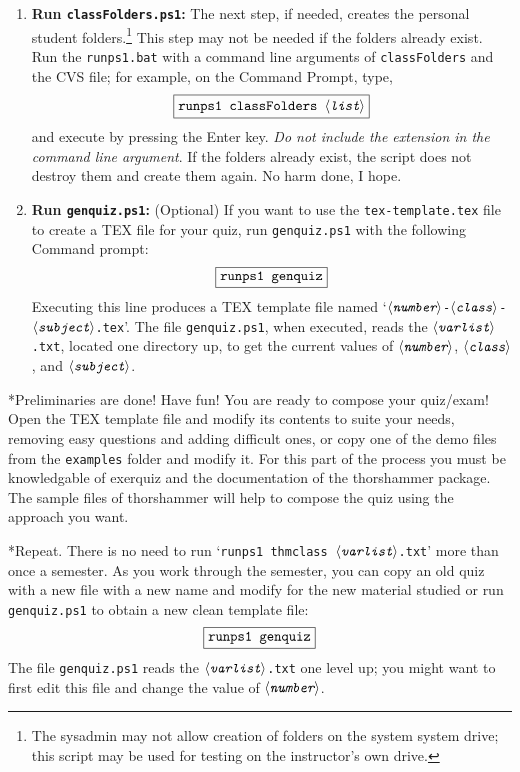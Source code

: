 \documentclass{article}
\makeatletter
\let\pkg\textsf
\let\app\textsf
\let\uif\textsf
\def\ameta#1{\ensuremath{\langle\textit{\texttt{#1}}\rangle}}
\renewcommand{\paragraph}
    {\@startsection{paragraph}{4}{0pt}{6pt}{-3pt}{\bfseries}}
\makeatother
\begin{document}
\begin{enumerate}
  \item \textbf{Run \texttt{classFolders.ps1}:} The next step,
      if needed, creates the personal student
      folders.\footnote{The sysadmin may not allow creation of
      folders on the system system drive; this script may be
      used for testing on the instructor's own drive.} This
      step may not be needed if the folders already exist. Run
      the \texttt{runps1.bat} with a command line arguments of
      \texttt{classFolders} and the CVS file; for example, on
      the \app{Command Prompt}, type,
\begin{equation}
    \fbox{\ttfamily runps1 classFolders \ameta{list}}\label{dis:classFolders}
\end{equation}
and execute by pressing the \uif{Enter} key. \emph{Do not
include the extension in the command line argument}.  If the
folders already exist, the script does not destroy them and
create them again. No harm done, I hope.
\item \textbf{Run \texttt{genquiz.ps1}:} (Optional) If you
    want to use the \texttt{tex-template.tex} file to create a
    TEX file for your quiz, run \texttt{genquiz.ps1} with
    the following \uif{Command prompt}:
\begin{equation}
    \fbox{\ttfamily runps1 genquiz}\label{dis:genquiz}
\end{equation}
Executing this line produces a TEX template file named
`\texttt{\ameta{number}-\ameta{class}-\ameta{subject}.tex}'. The file
\texttt{genquiz.ps1}, when executed, reads the
\texttt{\ameta{varlist}.txt}, located one directory up, to get the current
values of \ameta{number}, \ameta{class}, and \ameta{subject}.

\end{enumerate}

\paragraph*{Preliminaries are done! Have fun!} You are ready to
compose your quiz/exam! Open the TEX template file and modify
its contents to suite your needs, removing easy questions and
adding difficult ones, or copy one of the demo files from the
\texttt{examples} folder and modify it. For this part of the
process you must be knowledgable of \pkg{exerquiz} and the
documentation of the \pkg{thorshammer} package. The sample files
of \pkg{thorshammer} will help to compose the quiz using the
approach you want.


\paragraph*{Repeat.} There is no need to run `\texttt{runps1 thmclass \ameta{varlist}.txt}'
more than once a semester. As you work through the semester, you can copy an
old quiz with a new file with a new name and modify for the new material
studied or run \texttt{genquiz.ps1} to obtain a new clean template file:
\[
    \fbox{\ttfamily runps1 genquiz}
\]
The file \texttt{genquiz.ps1} reads the
\texttt{\ameta{varlist}.txt} one level up; you might want to
first edit this file and change the value of \ameta{number}.
\end{document}
